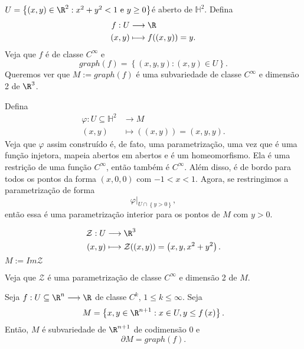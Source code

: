 \begin{eg}
    $U = \left\{ \left( x,y \right) \in \R^{2} : x^2 + y^2 < 1 \text{ e }y\ge 0 \right\} $é aberto de $\mathbb{H}^{2}$. Defina
    \begin{align*}
        f: U &\longrightarrow \R \\
        \left( x,y \right)  &\longmapsto f(\left( x,y \right) ) = y
    .\end{align*}
    Veja que $f$ é de classe $C^{\infty}$ e \[
    graph\left( f \right) = \left\{ \left( x, y, y \right) : \left( x,y \right) \in U \right\} 
    .\] Queremos ver que $M := graph\left( f \right) $ é uma subvariedade de classe $C^{\infty}$ e dimensão 2 de $\R^{3}$.

    Defina 
    \begin{align*}
        \varphi :U\subseteq \mathbb{H}^{2}  &\longrightarrow M  \\
        \left( x,y \right)  &\longmapsto (\left( x,y \right) ) = \left( x,y,y \right)
    .\end{align*}
    Veja que $\varphi $ assim construído é, de fato, uma parametrização, uma vez que é uma função injetora, mapeia abertos em abertos e é um homeomorfismo. Ela é uma restrição de uma função $C^{\infty}$, então também é $C^{\infty}$. Além disso, é de bordo para todos os pontos da forma $\left( x,0,0 \right) $ com $-1<x<1$. Agora, se restringimos a parametrização de forma \[
    \varphi \Big|_{U\cap \left\{ y>0 \right\} }
    ,\] então essa é uma parametrização interior para os pontos de $M$ com $y>0$.
\end{eg}

\begin{eg}
    \begin{align*}
        \mathcal{Z}: U &\longrightarrow \R^{3} \\
        \left( x,y \right)  &\longmapsto \mathcal{Z}(\left( x,y \right) ) = \left( x,y,x^2+y^2 \right) 
    .\end{align*}
    $M:= Im \mathcal{Z}$

    Veja que $\mathcal{Z}$ é uma parametrização de classe $C^{\infty}$ e dimensão 2 de $M$.
\end{eg}

\begin{prop}
    Seja $f: U\subseteq\R^{n} \longrightarrow \R$ de classe $C^{k}$, $1\le k\le \infty$. Seja \[
    M = \left\{ x,y \in \R^{n+1} : x\in U, y\le f\left( x \right) \right\} 
    .\] Então, $M$ é subvariedade de $\R^{n+1}$ de codimensão 0 e \[
    \partial M = graph\left( f \right)  
    .\] 
\end{prop}

